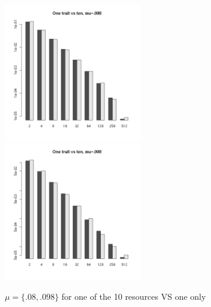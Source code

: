 \documentclass[a4paper]{article}
\begin{document}
\begin{figure}[h]
	\begin{center}
		\includegraphics[width=6cm]{img/OneVsTenMu098.png}
		\includegraphics[width=6cm]{img/OneVsTenMu008.png}
	\end{center}
	\caption{$\mu=\{.08,.098\}$ for one of the 10 resources VS one only}
	\label{fig:OneVsTen}
\end{figure}


  
\end{document}
